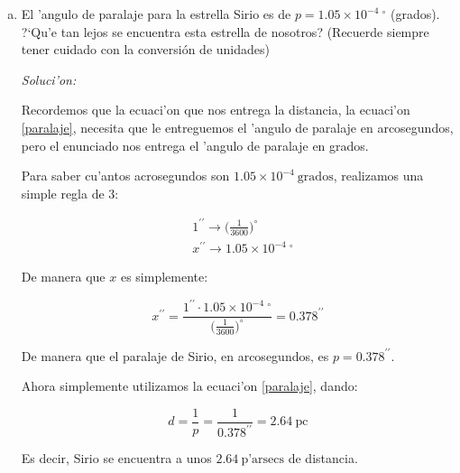 \documentclass{article}
\begin{document}
\begin{enumerate} [a)]
Es m'as, si observan el dedo pulgar cuando acercan su mano mucho a su cara e intercalan el ojo abierto, ver'an que el dedo pulgar cambia mucho su posici'on; pero a medida que vayan alejando su dedo de ustedes, la variaci'on de posici'on del dedo ir'a siendo cada vez m'as peque'na. Una peque'na muestra de que el paralaje, a medida de que las cosas est'an m'as lejos, es m'as dif'icil de percibir y medir.

\item El 'angulo de paralaje para la estrella Sirio es de $p = 1.05 \times 10^{-4} \ ^{\circ}$ (grados). ?`Qu'e tan lejos se encuentra esta estrella de nosotros? (Recuerde siempre tener cuidado con la conversión de unidades)

\vspace{2mm}
\textit{Soluci'on:}
\vspace{2mm}

Recordemos que la ecuaci'on que nos entrega la distancia, la ecuaci'on \eqref{paralaje}, necesita que le entreguemos el 'angulo de paralaje en arcosegundos, pero el enunciado nos entrega el 'angulo de paralaje en grados.

Para saber cu'antos acrosegundos son $1.05 \times 10^{-4} \ \text{grados}$, realizamos una simple regla de 3:

\begin{align*}
& 1^{\prime \prime} \rightarrow \Big( \frac{1}{3600} \Big) ^\circ \\
& x^{\prime \prime} \rightarrow 1.05 \times 10^{-4} \ ^{\circ}
\end{align*}

De manera que $x$ es simplemente:

\begin{equation*}
x^{\prime \prime} = \frac{1^{\prime \prime} \cdot 1.05 \times 10^{-4} \ ^{\circ}}{ \Big( \frac{1}{3600}\Big) ^\circ } = 0.378^{\prime \prime}
\end{equation*}

De manera que el paralaje de Sirio, en arcosegundos, es $p = 0.378^{\prime \prime}$.

Ahora simplemente utilizamos la ecuaci'on \eqref{paralaje}, dando:

\begin{equation*}
d = \frac{1}{p} = \frac{1}{0.378^{\prime \prime}} = 2.64 \ \text{pc}
\end{equation*}

Es decir, Sirio se encuentra a unos $2.64 \ \text{p'arsecs}$ de distancia.



\end{enumerate}
\end{document}
